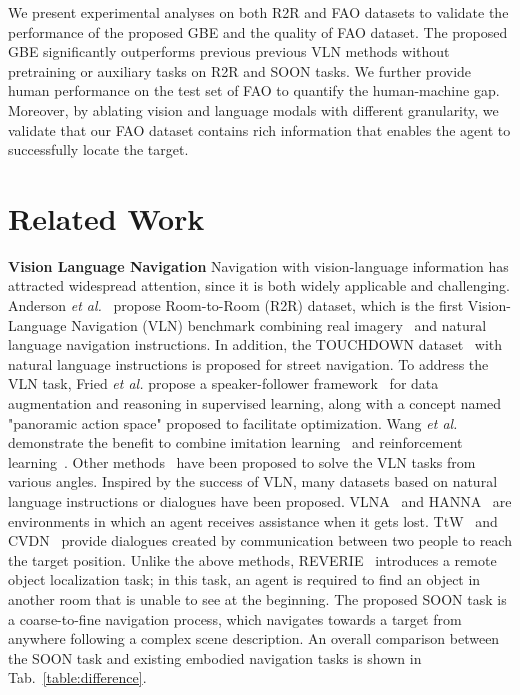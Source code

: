 \documentclass[final]{cvpr}
\begin{document}
We present experimental analyses on both R2R and FAO datasets to validate the performance of the proposed GBE and the quality of FAO dataset. 
The proposed GBE significantly outperforms previous previous VLN methods without pretraining or auxiliary tasks on R2R and SOON tasks. 
We further provide human performance on the test set of FAO to quantify the human-machine gap. 
Moreover, by ablating vision and language modals with different granularity, we validate that our FAO dataset contains rich information that enables the agent to successfully locate the target. 

\section{Related Work}
\noindent\textbf{Vision Language Navigation} 
Navigation with vision-language information has attracted widespread attention, since it is both widely applicable and challenging. 
Anderson \emph{et al.}~\cite{anderson2018vision} propose Room-to-Room (R2R) dataset, which is the first Vision-Language Navigation (VLN) benchmark combining real imagery~\cite{chang2017matterport3d} and natural language navigation instructions. 
In addition, the TOUCHDOWN dataset~\cite{chen2019touchdown} with natural language instructions is proposed for street navigation. 
To address the VLN task, Fried \emph{et al.} propose a speaker-follower framework~\cite{fried2018speaker} for data augmentation and reasoning in supervised learning, along with a concept named "panoramic action space" proposed to facilitate optimization. Wang \emph{et al.}~\cite{wang2018reinforced} demonstrate the benefit to combine imitation learning~\cite{bojarski2016end, ho2016generative} and reinforcement learning~\cite{mnih2016asynchronous, schulman2017proximal}. Other methods~\cite{wang2018look, ma2019self, ma2019the, tan2019learning, ke2019tactical, huang2019transferable} have been proposed to solve the VLN tasks from various angles. 
Inspired by the success of VLN, many datasets based on natural language instructions or dialogues have been proposed. VLNA~\cite{nguyen2019vision} and HANNA~\cite{nguyen2019help} are environments in which an agent receives assistance when it gets lost. TtW~\cite{de2018talk} and CVDN~\cite{thomason2019vision} provide dialogues created by communication between two people to reach the target position. Unlike the above methods, REVERIE~\cite{qi2019reverie} introduces a remote object localization task; in this task, an agent is required to find an object in another room that is unable to see at the beginning. 
The proposed SOON task is a coarse-to-fine navigation process, which navigates towards a target from anywhere following a complex scene description. 
An overall comparison between the SOON task and existing embodied navigation tasks is shown in Tab.~\ref{table:difference}.
\end{document}
